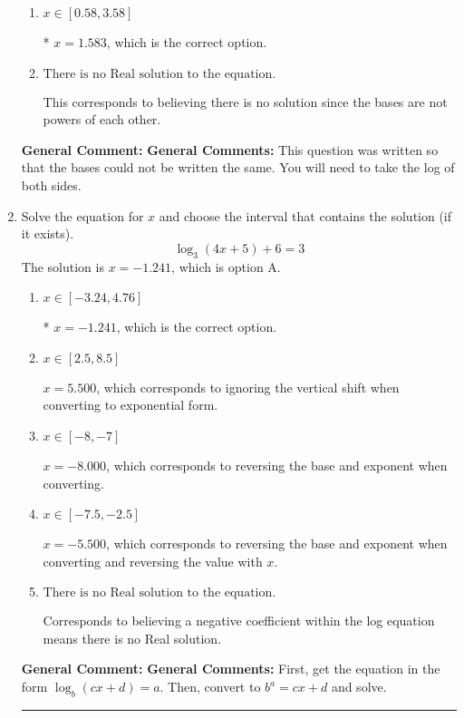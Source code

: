 \documentclass{extbook}[14pt]
\newcommand{\litem}[1]{\item #1

\rule{\textwidth}{0.4pt}}
\begin{document}
\begin{enumerate}
{\begin{enumerate}[label=\Alph*.]
$x = 23.696$, which corresponds to distributing the $\ln(base)$ to the second term of the exponent only.
\item \( x \in [0.58, 3.58] \)

* $x = 1.583$, which is the correct option.
\item \( \text{There is no Real solution to the equation.} \)

This corresponds to believing there is no solution since the bases are not powers of each other.
\end{enumerate}

\textbf{General Comment:} \textbf{General Comments:} This question was written so that the bases could not be written the same. You will need to take the log of both sides.
}
\litem{
Solve the equation for $x$ and choose the interval that contains the solution (if it exists).
\[ \log_{3}{(4x+5)}+6 = 3 \]The solution is \( x = -1.241 \), which is option A.\begin{enumerate}[label=\Alph*.]
\item \( x \in [-3.24, 4.76] \)

* $x = -1.241$, which is the correct option.
\item \( x \in [2.5, 8.5] \)

$x = 5.500$, which corresponds to ignoring the vertical shift when converting to exponential form.
\item \( x \in [-8, -7] \)

$x = -8.000$, which corresponds to reversing the base and exponent when converting.
\item \( x \in [-7.5, -2.5] \)

$x = -5.500$, which corresponds to reversing the base and exponent when converting and reversing the value with $x$.
\item \( \text{There is no Real solution to the equation.} \)

Corresponds to believing a negative coefficient within the log equation means there is no Real solution.
\end{enumerate}

\textbf{General Comment:} \textbf{General Comments:} First, get the equation in the form $\log_b{(cx+d)} = a$. Then, convert to $b^a = cx+d$ and solve.
}
\end{enumerate}
\end{document}
